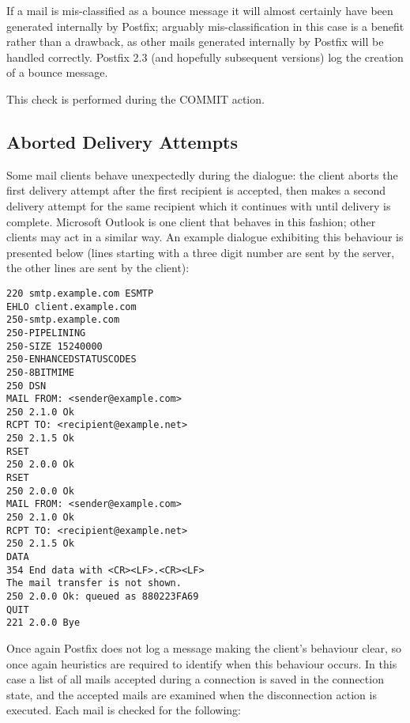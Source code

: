 If a mail is mis-classified as a bounce message it will almost certainly
have been generated internally by Postfix; arguably mis-classification in
this case is a benefit rather than a drawback, as other mails generated
internally by Postfix will be handled correctly.  Postfix 2.3 (and
hopefully subsequent versions) log the creation of a bounce message.

This check is performed during the COMMIT action.

\subsection{Aborted Delivery Attempts}

\label{aborted-delivery-attempts}

Some mail clients behave unexpectedly during the  dialogue:
the client aborts the first delivery attempt after the first recipient is
accepted, then makes a second delivery attempt for the same recipient which
it continues with until delivery is complete.  Microsoft Outlook is one
client that behaves in this fashion; other clients may act in a similar
way.  An example dialogue exhibiting this behaviour is presented below
(lines starting with a three digit number are sent by the server, the other
lines are sent by the client):

\begin{verbatim}
220 smtp.example.com ESMTP
EHLO client.example.com
250-smtp.example.com
250-PIPELINING
250-SIZE 15240000
250-ENHANCEDSTATUSCODES
250-8BITMIME
250 DSN
MAIL FROM: <sender@example.com>
250 2.1.0 Ok
RCPT TO: <recipient@example.net>
250 2.1.5 Ok
RSET
250 2.0.0 Ok
RSET
250 2.0.0 Ok
MAIL FROM: <sender@example.com>
250 2.1.0 Ok
RCPT TO: <recipient@example.net>
250 2.1.5 Ok
DATA
354 End data with <CR><LF>.<CR><LF>
The mail transfer is not shown.
250 2.0.0 Ok: queued as 880223FA69
QUIT
221 2.0.0 Bye
\end{verbatim}

Once again Postfix does not log a message making the client's behaviour
clear, so once again heuristics are required to identify when this
behaviour occurs.  In this case a list of all mails accepted during a
connection is saved in the connection state, and the accepted mails are
examined when the disconnection action is executed.  Each mail is checked
for the following: 

